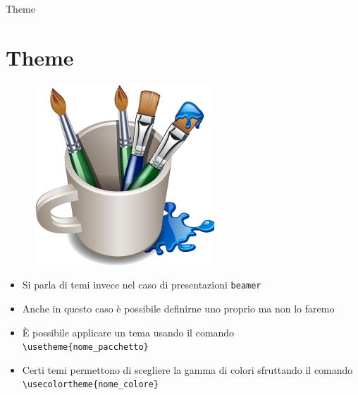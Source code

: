 \begin{frame}{Theme}

\section{Theme}
\begin{figure}
	\centering
	\includegraphics[scale=0.20]{res/images/temi}
\end{figure}

\begin{itemize}
	\item Si parla di temi invece nel caso di presentazioni \texttt{beamer}
	\item Anche in questo caso è possibile definirne uno proprio ma non lo
	faremo
	\item È possibile applicare un tema usando il comando
	\texttt{\textbackslash{}usetheme\{nome\_pacchetto\}}
	\item Certi temi permettono di scegliere la gamma di colori sfruttando il
	comando \texttt{\textbackslash{}usecolortheme\{nome\_colore\}}
\end{itemize}

\end{frame}
